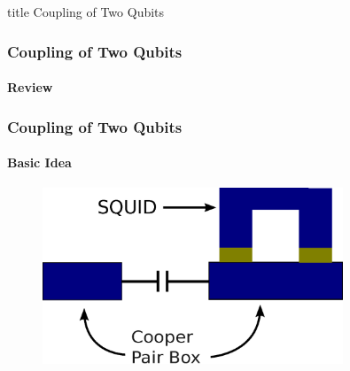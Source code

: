 \documentclass{beamer}
\begin{document}

\begin{frame}
    \vfill
    \centering
    \begin{beamercolorbox}[sep=8pt,center,shadow=true,rounded=true]{title}
        Coupling of Two Qubits
    \end{beamercolorbox}
    \vfill
\end{frame}


\begin{frame}
    \frametitle{Coupling of Two Qubits}
    \framesubtitle{Review}
\end{frame}


\begin{frame}
    \frametitle{Coupling of Two Qubits}
    \framesubtitle{Basic Idea}
    \begin{figure}[!htb]
        \centering
        \includegraphics[width=0.8\textwidth]{img/basic-structure.eps}
    \end{figure}
\end{frame}

\end{document}

